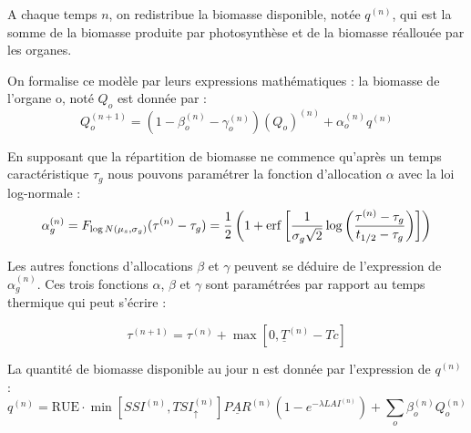 A chaque temps $n$, on redistribue la biomasse disponible, notée $q^{(n)}$, qui est la somme de la biomasse produite par photosynthèse et de la biomasse réallouée par les organes.

On formalise ce modèle par leurs expressions mathématiques : 
la biomasse de l'organe o, noté $Q_o$ est donnée par :
\[ 
  {Q_o^{(n+1)}} = (1-\beta_o^{(n)}-\gamma_o^{(n)} )(Q_o)^{(n)}
  +\alpha_o^{(n)}q^{(n)} 
\]

En supposant que la répartition de biomasse ne commence qu'après un temps caractéristique $\tau_g$ nous pouvons paramétrer la fonction d'allocation $\alpha$ avec la loi log-normale :
\[ 
  {\alpha_g^{(n)}}=F_{\log N(\mu_s,\sigma_g)}(\tau^{(n)}-\tau_g)
  =\frac{1}{2} \left(1 + \operatorname{erf}\left[\frac{1}{\sigma_g \sqrt{2}}
  \log\left(\frac{\tau^{(n)}-\tau_g}{t_{1/2}-\tau_g}\right)\right]\right)
\]

Les autres fonctions d'allocations $\beta$ et $\gamma$   peuvent se déduire de l'expression de $\alpha_g^{(n)}$.
Ces trois fonctions $\alpha$, $\beta$ et $\gamma$ sont paramétrées par rapport au temps thermique qui peut s'écrire :

\[ {\tau}^{(n+1)}=\tau^{(n)}+\max[0,\underline{T}^{(n)}-Tc] \]

La quantité de biomasse disponible au jour n est donnée par l'expression de $q^{(n)}$ :
\[ 
{q^{(n)}} = \text{RUE}\cdot \min[SSI^{(n)}, TSI_\uparrow^{(n)}]\underline{PAR}^{(n)}(1-e^{-\lambda LAI^{(n)}})+\sum_o \beta_o^{(n)}Q_o^{(n)} 
\]


